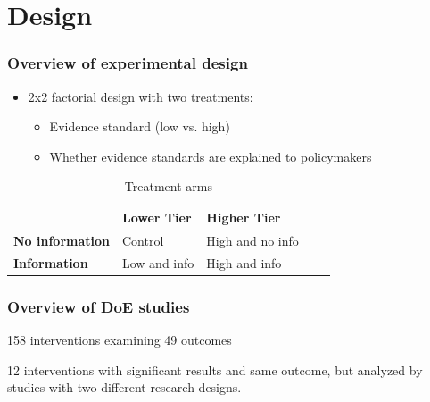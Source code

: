 \documentclass[usenames,dvipsnames]{beamer}
\begin{document}

\section{Design}

\begin{frame}
\frametitle{Overview of experimental design}

\begin{itemize}
\item 2x2 factorial design with two treatments:
\begin{itemize}
\item Evidence standard (low vs. high)
\item Whether evidence standards are explained to policymakers
\end{itemize}
\end{itemize}

\vspace{5mm}
\begin{table}[H]
\centering
\caption{Treatment arms}
\label{tab: arms} 
\bigbreak
\begin{tabular}{|l|l|l|l|l|}
\hline
& \textbf{Lower Tier} & \textbf{Higher Tier} \\ \hline
\textbf{No information} & Control & High and no info \\ \hline
\textbf{Information} & Low and info & High and info \\ \hline
\end{tabular}
\end{table}

\end{frame}




\begin{frame}
\frametitle{Overview of DoE studies}

158 interventions examining 49 outcomes %

\textcolor{Cerulean}{12} interventions with significant results and same outcome, but analyzed by studies with two different research designs.

\vspace{-4mm}
\captionsetup{labelformat=empty}


\end{frame}

\end{document}
